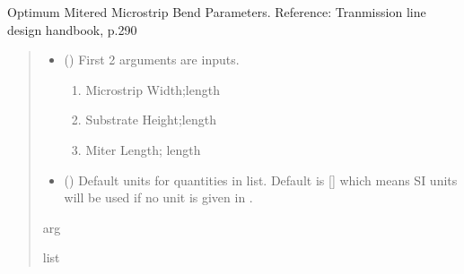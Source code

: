 \documentclass[letterpaper,10pt,english]{sphinxmanual}
\begin{document}

\begin{fulllineitems}
\label{\detokenize{components:components.OptimumMitered90DegMicrostripBend}}
\pysigstartsignatures
{}
\pysigstopsignatures
\sphinxAtStartPar
Optimum Mitered Microstrip Bend Parameters.
Reference: Tranmission line design handbook, p.290
\begin{quote}\begin{description}
\begin{itemize}
\item {}
\sphinxAtStartPar
{} () \textendash{}
\sphinxAtStartPar
First 2 arguments are inputs.
\begin{enumerate}
%
\item {}
\sphinxAtStartPar
Microstrip Width;length

\item {}
\sphinxAtStartPar
Substrate Height;length

\item {}
\sphinxAtStartPar
Miter Length; length

\end{enumerate}


\item {}
\sphinxAtStartPar
{} (\sphinxstyleliteralemphasis{\sphinxupquote{, }}) \textendash{} Default units for quantities in  list. Default is {[}{]} which means SI units will be used if no unit is given in .

\end{itemize}

\sphinxAtStartPar
arg

\sphinxAtStartPar
list

\end{description}\end{quote}

\end{fulllineitems}
\end{document}
